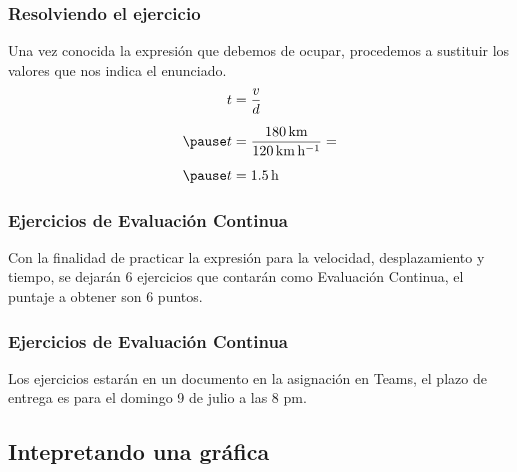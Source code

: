 \documentclass[14pt]{beamer}
\begin{document}
\begin{frame}
\frametitle{Resolviendo el ejercicio}
 Una vez conocida la expresión que debemos de ocupar, procedemos a sustituir los valores que nos indica el enunciado.
\pause
\begin{eqnarray*}
\begin{aligned}
t &= \dfrac{v}{d} \\[0.5em] \pause
t &= \dfrac{\SI{180}{\kilo\meter}}{\SI{120}{\kilo\meter\per\hour}} = \\[0.5em] \pause
t &= \SI{1.5}{\hour}
\end{aligned}
\end{eqnarray*}
\end{frame}
\begin{frame}
\frametitle{Ejercicios de Evaluación Continua}
Con la finalidad de practicar la expresión para la velocidad, desplazamiento y tiempo, se dejarán $6$ ejercicios que contarán como Evaluación Continua, el puntaje a obtener son $6$ puntos.
\end{frame}
\begin{frame}
\frametitle{Ejercicios de Evaluación Continua}
Los ejercicios estarán en un documento en la asignación en Teams, el plazo de entrega es para el domingo 9 de julio a las 8 pm.
\end{frame}

\subsection{Intepretando una gráfica}
\end{document}

